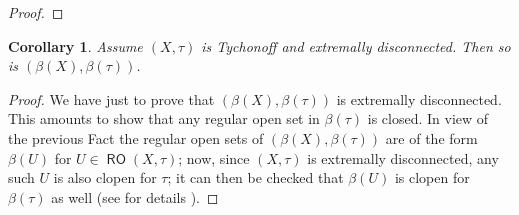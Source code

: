 \documentclass[11pt]{amsart}
\theoremstyle{plain}
\newtheorem{corollary}[theorem]{Corollary}
\theoremstyle{definition}
\theoremstyle{plain}
\theoremstyle{remark}
\DeclareMathOperator{\RO}{\mathsf{RO}}
\newcommand{\bp}[1]{\left\lbrace #1 \right\rbrace}
\newcommand{\0}{\mathsf{0}}
\renewcommand{\1}{\mathsf{1}}
\renewcommand{\2}{\mathsf{2}}
\theoremstyle{definition}
\begin{document}
\begin{proof}
%
%
%
%
%
%
%
\end{proof}

\begin{corollary}
\label{corol:betazextrdisc}
Assume $(X,\tau)$ is Tychonoff and extremally disconnected. Then so is 
$(\beta(X),\beta(\tau))$.
\end{corollary}
 \begin{proof}
We have just to prove that $(\beta(X),\beta(\tau))$ is extremally disconnected. This amounts to show that any regular open set in $\beta(\tau)$ is closed. In view of the previous Fact the regular open sets of $(\beta(X),\beta(\tau))$ are of the form $\beta(U)$ for $U\in \RO(X,\tau)$;
now, since $(X,\tau)$ is extremally disconnected, any such $U$ is also clopen for $\tau$;
it can then be checked that $\beta(U)$ is clopen for $\beta(\tau)$ as well (see for details \cite[Proposition D.3.10(7)]{viale-bookonforcing}).
\end{proof}
\end{document}
